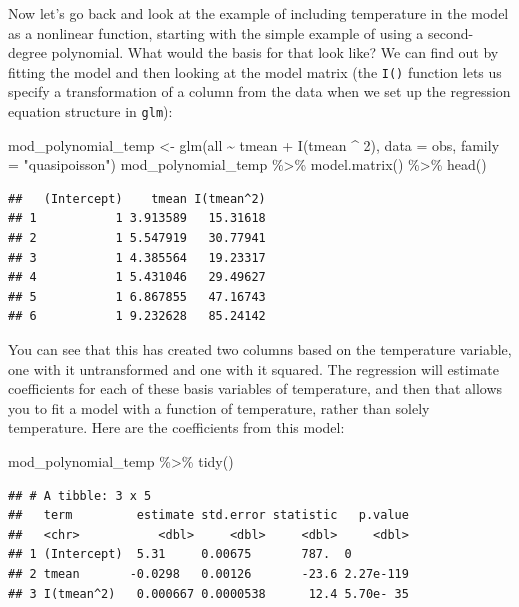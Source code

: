 \documentclass[
]{book}
\newenvironment{Shaded}{\begin{snugshade}}{\end{snugshade}}
\newcommand{\AttributeTok}[1]{\textcolor[rgb]{0.77,0.63,0.00}{#1}}
\newcommand{\DecValTok}[1]{\textcolor[rgb]{0.00,0.00,0.81}{#1}}
\newcommand{\FunctionTok}[1]{\textcolor[rgb]{0.00,0.00,0.00}{#1}}
\newcommand{\NormalTok}[1]{#1}
\newcommand{\OtherTok}[1]{\textcolor[rgb]{0.56,0.35,0.01}{#1}}
\newcommand{\SpecialCharTok}[1]{\textcolor[rgb]{0.00,0.00,0.00}{#1}}
\newcommand{\StringTok}[1]{\textcolor[rgb]{0.31,0.60,0.02}{#1}}
\begin{document}
Now let's go back and look at the example of including temperature in the model as a nonlinear
function, starting with the simple example of using a second-degree polynomial. What would
the basis for that look like? We can find out by fitting the model and then looking at the
model matrix (the \texttt{I()} function lets us specify a transformation of a column from the
data when we set up the regression equation structure in \texttt{glm}):

\begin{Shaded}
\begin{Highlighting}[]
\NormalTok{mod\_polynomial\_temp }\OtherTok{\textless{}{-}} \FunctionTok{glm}\NormalTok{(all }\SpecialCharTok{\textasciitilde{}}\NormalTok{ tmean }\SpecialCharTok{+} \FunctionTok{I}\NormalTok{(tmean }\SpecialCharTok{\^{}} \DecValTok{2}\NormalTok{), }
                           \AttributeTok{data =}\NormalTok{ obs, }\AttributeTok{family =} \StringTok{"quasipoisson"}\NormalTok{)}
\NormalTok{mod\_polynomial\_temp }\SpecialCharTok{\%\textgreater{}\%} 
  \FunctionTok{model.matrix}\NormalTok{() }\SpecialCharTok{\%\textgreater{}\%} 
  \FunctionTok{head}\NormalTok{()}
\end{Highlighting}
\end{Shaded}

\begin{verbatim}
##   (Intercept)    tmean I(tmean^2)
## 1           1 3.913589   15.31618
## 2           1 5.547919   30.77941
## 3           1 4.385564   19.23317
## 4           1 5.431046   29.49627
## 5           1 6.867855   47.16743
## 6           1 9.232628   85.24142
\end{verbatim}

You can see that this has created two columns based on the temperature variable, one with
it untransformed and one with it squared. The regression will estimate coefficients for each
of these basis variables of temperature, and then that allows you to fit a model with a
function of temperature, rather than solely temperature. Here are the coefficients from
this model:

\begin{Shaded}
\begin{Highlighting}[]
\NormalTok{mod\_polynomial\_temp }\SpecialCharTok{\%\textgreater{}\%} 
  \FunctionTok{tidy}\NormalTok{()}
\end{Highlighting}
\end{Shaded}

\begin{verbatim}
## # A tibble: 3 x 5
##   term         estimate std.error statistic   p.value
##   <chr>           <dbl>     <dbl>     <dbl>     <dbl>
## 1 (Intercept)  5.31     0.00675       787.  0        
## 2 tmean       -0.0298   0.00126       -23.6 2.27e-119
## 3 I(tmean^2)   0.000667 0.0000538      12.4 5.70e- 35
\end{verbatim}
\end{document}
